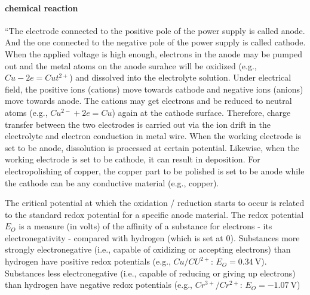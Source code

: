 \paragraph{chemical reaction}
``The electrode connected to the positive pole of the power supply is called anode. And the one connected to the negative pole of the power supply is called cathode. When the applied voltage is high enough, electrons in the anode may be pumped out and the metal atoms on the anode surahce will be oxidized (e.g., $Cu - 2e = Cut^{2+}$) and dissolved into the electrolyte solution. Under electrical field, the positive ions (cations) move towards cathode and negative ions (anions) move towards anode. The cations may get electrons and be reduced to neutral atoms (e.g., $Cu^{2-} + 2e = Cu$) again at the cathode surface. Therefore, charge transfer between the two electrodes is carried out via the ion drift in the electrolyte and electron conduction in metal wire. When the working electrode is set to be anode, dissolution is processed at certain potential. Likewise, when the working electrode is set to be cathode, it can result in deposition. For electropolishing of copper, the copper part to be polished is set to be anode while the cathode can be any conductive material (e.g., copper).

The critical potential at which the oxidation / reduction starts to occur is related to the standard redox potential for a specific anode material. The redox potential $E_O$ is a measure (in volts) of the affinity of a substance for electrons - its electronegativity - compared with hydrogen (which is set at 0). Substances more strongly electronegative (i.e., capable of oxidizing or accepting electrons) than hydrogen have positive redox potentials (e.g., $Cu/CU^{2+}$: $E_O = \SI{0.34}{\volt}$). Substances less electronegative (i.e., capable of reducing or giving up electrons) than hydrogen have negative redox potentials (e.g., $Cr^{3+}/Cr^{2+}$: $E_O = \SI{-1.07}{\volt}$)\cite{jinshan_electrochemical_2004}

